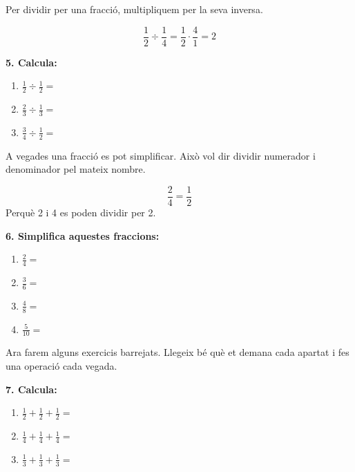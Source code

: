 \documentclass[12pt,a4paper]{article}
\begin{document}
\begin{capsula}
Per dividir per una fracció, multipliquem per la seva inversa.
\end{capsula}

\begin{exemple}
\[
\frac{1}{2}\div\frac{1}{4}=\frac{1}{2}\cdot\frac{4}{1}=2
\]
\end{exemple}

\textbf{5. Calcula:}
\begin{enumerate}[label=\alph*)]
    \item \(\frac{1}{2}\div\frac{1}{2}=\) \vspace{0.8cm}
    \item \(\frac{2}{3}\div\frac{1}{3}=\) \vspace{0.8cm}
    \item \(\frac{3}{4}\div\frac{1}{2}=\) \vspace{0.8cm}
\end{enumerate}

\begin{capsula}
A vegades una fracció es pot simplificar. Això vol dir dividir numerador i denominador pel mateix nombre.
\end{capsula}

\begin{exemple}
\[
\frac{2}{4}=\frac{1}{2}
\]
Perquè 2 i 4 es poden dividir per 2.
\end{exemple}

\textbf{6. Simplifica aquestes fraccions:}
\begin{enumerate}[label=\alph*)]
    \item \(\frac{2}{4}=\) \vspace{0.6cm}
    \item \(\frac{3}{6}=\) \vspace{0.6cm}
    \item \(\frac{4}{8}=\) \vspace{0.6cm}
    \item \(\frac{5}{10}=\) \vspace{0.6cm}
\end{enumerate}

\begin{capsula}
Ara farem alguns exercicis barrejats. Llegeix bé què et demana cada apartat i fes una operació cada vegada.
\end{capsula}

\textbf{7. Calcula:}
\begin{enumerate}[label=\alph*)]
    \item \(\frac{1}{2}+\frac{1}{2}+\frac{1}{2}=\) \vspace{0.8cm}
    \item \(\frac{1}{4}+\frac{1}{4}+\frac{1}{4}=\) \vspace{0.8cm}
    \item \(\frac{1}{3}+\frac{1}{3}+\frac{1}{3}=\) \vspace{0.8cm}
\end{enumerate}
\end{document}
